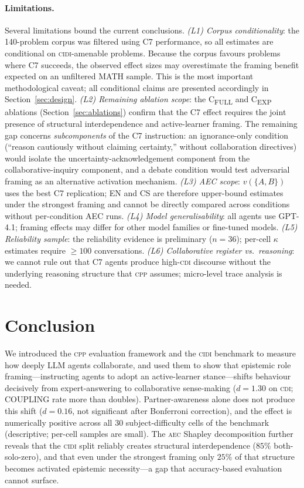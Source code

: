 \documentclass{article}
\newcommand{\CDI}{\textsc{cdi}}
\newcommand{\CPP}{\textsc{cpp}}
\newcommand{\CIDI}{\textsc{cidi}}
\newcommand{\AEC}{\textsc{aec}}
\begin{document}
\paragraph{Limitations.}
Several limitations bound the current conclusions.
\emph{(L1) Corpus conditionality}: the 140-problem corpus was filtered
using C7 performance, so all estimates are conditional on
\CIDI-amenable problems. Because the corpus favours problems where C7
succeeds, the observed effect sizes may overestimate the framing
benefit expected on an unfiltered MATH sample. This is the most
important methodological caveat; all conditional claims are presented
accordingly in Section~\ref{sec:design}.
\emph{(L2) Remaining ablation scope}: the C\textsubscript{FULL} and
C\textsubscript{EXP} ablations (Section~\ref{sec:ablations}) confirm
that the C7 effect requires the joint presence of structural
interdependence and active-learner framing. The remaining gap concerns
\emph{subcomponents} of the C7 instruction: an ignorance-only condition
(``reason cautiously without claiming certainty,'' without collaboration
directives) would isolate the uncertainty-acknowledgement component from
the collaborative-inquiry component, and a debate condition would test
adversarial framing as an alternative activation mechanism.
\emph{(L3) AEC scope}: $v(\{A,B\})$ uses the best C7 replication; EN
and CS are therefore upper-bound estimates under the strongest framing
and cannot be directly compared across conditions without per-condition
AEC runs.
\emph{(L4) Model generalisability}: all agents use GPT-4.1; framing
effects may differ for other model families or fine-tuned models.
\emph{(L5) Reliability sample}: the reliability evidence is
preliminary ($n=36$); per-cell $\kappa$ estimates require $\geq 100$
conversations.
\emph{(L6) Collaborative register vs.\ reasoning}: we cannot rule out
that C7 agents produce high-\CDI{} discourse without the underlying
reasoning structure that \CPP{} assumes; micro-level trace analysis is
needed.

\section{Conclusion}
\label{sec:conclusion}

We introduced the \CPP{} evaluation framework and the \CIDI{}
benchmark to measure how deeply LLM agents collaborate, and used them
to show that epistemic role framing---instructing agents to adopt an
active-learner stance---shifts behaviour decisively from
expert-answering to collaborative sense-making ($d = 1.30$ on \CDI;
COUPLING rate more than doubles). Partner-awareness alone does not
produce this shift ($d = 0.16$, not significant after Bonferroni
correction), and the effect is numerically positive across all 30
subject-difficulty cells of the benchmark (descriptive; per-cell samples
are small). The \AEC{} Shapley decomposition further reveals that the
\CIDI{} split reliably creates structural interdependence ($85\%$
both-solo-zero), and that even under the strongest framing only $25\%$
of that structure becomes activated epistemic necessity---a gap that
accuracy-based evaluation cannot surface.
\end{document}
